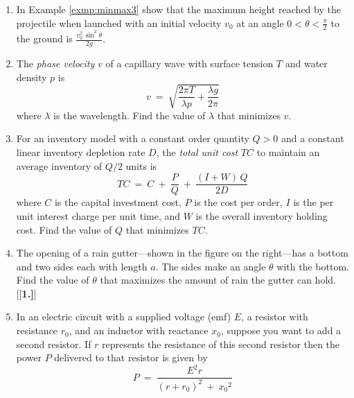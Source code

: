 {\begin{enumerate}[\bfseries 1.]
 \item\label{exer:projmaxangle} In Example \ref{exmp:minmax3} show that the
  maximum height reached by the projectile when launched with an initial
  velocity $v_0$ at an angle $0<\theta<\frac{\pi}{2}$ to the ground is
  $\frac{v_0^2\,\sin^2 \theta}{2g}$.
 \item The \emph{phase velocity} $v$ of a capillary wave with surface tension
  $T$ and water density $p$ is
\[
v ~=~ \sqrt{\frac{2\pi T}{\lambda p} + \frac{\lambda g}{2\pi}}
\]
where $\lambda$ is the wavelength. Find the value of $\lambda$ that minimizes
$v$.
 \item\label{exer:inventory} For an inventory model with a constant order
  quantity $Q>0$ and a constant linear inventory depletion rate $D$, the
  \emph{total unit cost} $TC$ to maintain an average inventory of $Q/2$ units is
\[
TC ~=~ C ~+~ \frac{P}{Q} ~+~ \frac{(I+W)\,Q}{2D}
\]
where $C$ is the capital investment cost, $P$ is the cost per order, $I$ is
the per unit interest charge per unit time, and $W$ is the overall inventory
holding cost. Find the value of $Q$ that minimizes $TC$.
 \item The opening of a rain gutter---shown in the figure on the right---has
a bottom and two sides each with length $a$. The sides make an angle $\theta$
with the bottom. Find the value of $\theta$ that maximizes the amount of rain
the gutter can hold.
[{[\bfseries 1.]}]
 \item In an electric circuit with a supplied voltage (emf) $E$, a resistor
  with resistance $r_0$, and an inductor with reactance $x_0$, suppose you want
  to add a second resistor. If $r$ represents the resistance of this second
  resistor then the power $P$ delivered to that resistor is given by
 \begin{displaymath}
  P ~=~ \dfrac{E^2 r}{(r + r_0)^2 ~+~ {x_0}^2}

\end{displaymath}
\end{enumerate}}
